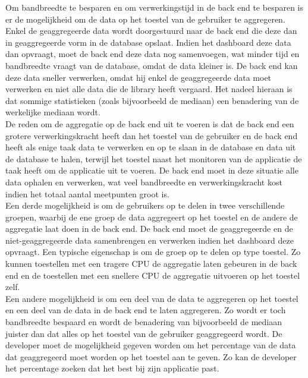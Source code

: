 Om bandbreedte te besparen en om verwerkingstijd in de back end te besparen is er de mogelijkheid om de data op het toestel van de gebruiker te aggregeren. Enkel de geaggregeerde data wordt doorgestuurd naar de back end die deze dan in geaggregeerde vorm in de database opslaat. Indien het dashboard deze data dan opvraagt, moet de back end deze data nog samenvoegen, wat minder tijd en bandbreedte vraagt van de database, omdat de data kleiner is. De back end kan deze data sneller verwerken, omdat hij enkel de geaggregeerde data moet verwerken en niet alle data die de library heeft vergaard. Het nadeel hieraan is dat sommige statistieken (zoals bijvoorbeeld de mediaan) een benadering van de werkelijke mediaan wordt. \\

De reden om de aggregatie op de back end uit te voeren is dat de back end een grotere verwerkingskracht heeft dan het toestel van de gebruiker en de back end heeft als enige taak data te verwerken en op te slaan in de database en data uit de database te halen, terwijl het toestel naast het monitoren van de applicatie de taak heeft om de applicatie uit te voeren. De back end moet in deze situatie alle data ophalen en verwerken, wat veel bandbreedte en verwerkingskracht kost indien het totaal aantal meetpunten groot is. \\

Een derde mogelijkheid is om de gebruikers op te delen in twee verschillende groepen, waarbij de ene groep de data aggregeert op het toestel en de andere de aggregatie laat doen in de back end. De back end moet de geaggregeerde en de niet-geaggregeerde data samenbrengen en verwerken indien het dashboard deze opvraagt. Een typische eigenschap is om de groep op te delen op type toestel. Zo kunnen toestellen met een tragere CPU de aggregatie laten gebeuren in de back end en de toestellen met een snellere CPU de aggregatie uitvoeren op het toestel zelf. \\

Een andere mogelijkheid is om een deel van de data te aggregeren op het toestel en een deel van de data in de back end te laten aggregeren. Zo wordt er toch bandbreedte bespaard en wordt de benadering van bijvoorbeeld de mediaan juister dan dat alles op het toestel van de gebruiker geaggregeerd wordt. De developer moet de mogelijkheid gegeven worden om het percentage van de data dat geaggregeerd moet worden op het toestel aan te geven. Zo kan de developer het percentage zoeken dat het best bij zijn applicatie past.\\ 

